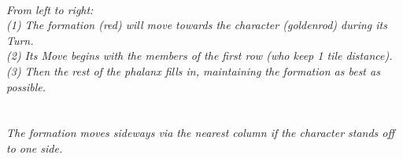 \begin{center}
\\
\emph{From left to right:\\
(1) The formation (red) will move towards the character (goldenrod) during its Turn.\\
(2) Its Move begins with the members of the first row (who keep 1 tile distance).\\
(3) Then the rest of the phalanx fills in, maintaining the formation as best as possible.}\\
\ \\
\\
\emph{The formation moves sideways via the nearest column if the character stands off to one side.}
\end{center}

